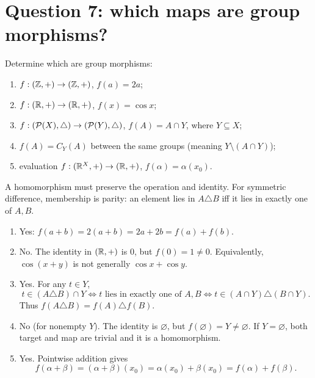 \documentclass[11pt,openany]{book}
\begin{document}
\section{Question 7: which maps are group morphisms?}
\begin{questionbox}
Determine which are group morphisms:
\begin{enumerate}[label=(\roman*)]
\item $f:(\mathbb Z,+)\to(\mathbb Z,+)$, $f(a)=2a$;
\item $f:(\mathbb R,+)\to(\mathbb R,+)$, $f(x)=\cos x$;
\item $f:(\mathcal P(X),\triangle)\to(\mathcal P(Y),\triangle)$, $f(A)=A\cap Y$, where $Y\subseteq X$;
\item $f(A)=C_Y(A)$ between the same groups (meaning $Y\setminus(A\cap Y)$);
\item evaluation $f:(\mathbb R^X,+)\to(\mathbb R,+)$, $f(\alpha)=\alpha(x_0)$.
\end{enumerate}
\end{questionbox}
\begin{approachbox}
A homomorphism must preserve the operation and identity. For symmetric difference, membership is parity: an element lies in $A\triangle B$ iff it lies in exactly one of $A,B$.
\end{approachbox}
\begin{solutionbox}
\begin{enumerate}[label=(\roman*)]
\item Yes: $f(a+b)=2(a+b)=2a+2b=f(a)+f(b)$.
\item No. The identity in $(\mathbb R,+)$ is $0$, but $f(0)=1\ne0$. Equivalently, $\cos(x+y)$ is not generally $\cos x+\cos y$.
\item Yes. For any $t\in Y$,
\[
t\in(A\triangle B)\cap Y
\iff t\text{ lies in exactly one of }A,B
\iff t\in(A\cap Y)\triangle(B\cap Y).
\]
Thus $f(A\triangle B)=f(A)\triangle f(B)$.
\item No (for nonempty $Y$). The identity is $\varnothing$, but
$f(\varnothing)=Y\ne\varnothing$. If $Y=\varnothing$, both target and map are trivial and it is a homomorphism.
\item Yes. Pointwise addition gives
\[
f(\alpha+\beta)=(\alpha+\beta)(x_0)=\alpha(x_0)+\beta(x_0)=f(\alpha)+f(\beta).
\]
\end{enumerate}
\end{solutionbox}
\end{document}

